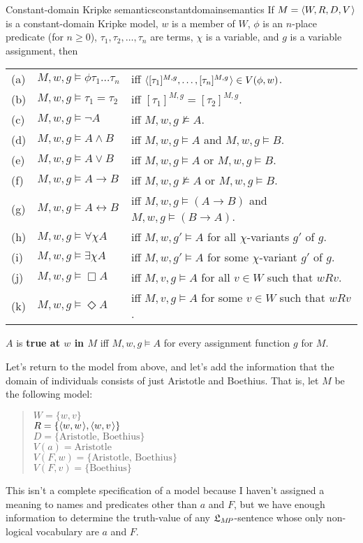 \begin{definition}{Constant-domain Kripke semantics}{constantdomainsemantics}
  If $\Mfr = \t{W,R,D,V}$ is a constant-domain Kripke model, $w$ is a member of
  $W$, $\phi$ is an $n$-place predicate (for $n\geq 0$),
  $\tau_1,\tau_{2},\ldots,\tau_{n}$ are terms, $\chi$ is a variable, and $g$ is a
  variable assignment, then
  
  \medskip\hspace{-4mm}
  \begin{tabular}{lll}
    (a) & $M,w,g \models \phi \tau_1\ldots \tau_n$ &iff $\t{[\tau_1]^{M,g},\ldots,[\tau_n]^{M,g}} \in V(\phi,w)$.\\
    (b) & $M,w,g \models \tau_1=\tau_2$ &iff $[\tau_1]^{M,g} = [\tau_2]^{M,g}$.\\
    (c) & $M,w,g \models \neg A$ &iff $M,w,g \not\models A$.\\
    (d) & $M,w,g \models A \land B$ &iff $M,w,g \models A$ and $M,w,g \models B$.\\
    (e) & $M,w,g \models A \lor B$ &iff $M,w,g \models A$ or $M,w,g \models B$.\\
    (f) & $M,w,g \models A \to B$ &iff $M,w,g \not\models A$ or $M,w,g \models B$.\\
    (g) & $M,w,g \models A \leftrightarrow B$ &iff $M,w,g \models (A\to B)$ and $M,w,g \models (B\to A)$.\\
    (h) & $M,w,g \models \forall \chi A$ &iff $M,w,g' \models A$ for all $\chi$-variants $g'$ of $g$.\\
    (i) & $M,w,g \models \exists \chi A$ &iff $M,w,g' \models A$ for some $\chi$-variant $g'$ of $g$.\\
    (j) & $M,w,g \models \Box A$ &iff $M,v,g \models A$ for all $v\in W$ such that $wRv$.\\
    (k) & $M,w,g \models \Diamond A$ &iff $M,v,g \models A$ for some $v\in W$ such that $wRv$.
  \end{tabular}

  $A$ is \textbf{true at $w$ in $M$} iff $M,w,g \models A$ for
  every assignment function $g$ for $M$.

\end{definition}

Let's return to the model from above, and let's add the information that the
domain of individuals consists of just Aristotle and Boethius. That is, let $M$
be the following model:
%
\begin{quote}
  $W = \{ w,v \}$\\
  $R = \{ \t{w,w}, \t{w,v} \}$\\
  $D = \{ \text{Aristotle, Boethius} \}$\\
  $V(a) = \text{Aristotle}$\\
  $V(F,w) = \{ \text{Aristotle, Boethius} \}$\\
  $V(F,v) = \{ \text{Boethius} \}$
\end{quote}
%
This isn't a complete specification of a model because I haven't assigned a
meaning to names and predicates other than $a$ and $F$, but we have enough
information to determine the truth-value of any $\mathfrak{L}_{M\!P}$-sentence whose only
non-logical vocabulary are $a$ and $F$.


